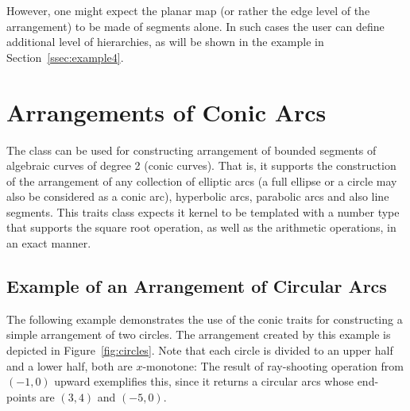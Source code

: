  However, one might expect the planar map (or rather the edge level of the 
arrangement) to be made of segments alone. In such cases the user can define 
additional level of hierarchies, as will be shown in the example in 
Section~\ref{ssec:example4}.


\section{Arrangements of Conic Arcs}

The  class can be used for constructing
arrangement of bounded segments of algebraic curves of degree 2 (conic 
curves). That is, it supports the construction of the arrangement of any 
collection of elliptic arcs (a full ellipse or a circle may also be considered
as a conic arc), hyperbolic arcs, parabolic arcs and also line segments.
This traits class expects it kernel to be templated with a number type
that supports the square root operation, as well as the arithmetic operations,
in an exact manner.

\subsection{Example of an Arrangement of Circular Arcs}
\label{ssec:example3}
The following example demonstrates the use of the conic traits for 
constructing a simple arrangement of two circles. The arrangement created 
by this example is depicted in Figure~\ref{fig:circles}. Note that each
circle is divided to an upper half and a lower half, both are $x$-monotone:
The result of ray-shooting operation from $(-1,0)$ upward exemplifies this, 
since it returns a circular arcs whose end-points are $(3,4)$ and $(-5,0)$.

